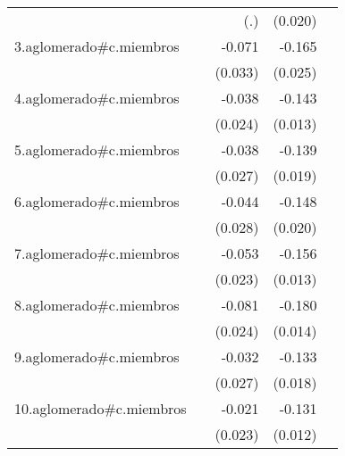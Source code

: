 {\begin{longtable}{l*{4}{D{.}{.}{-1}}}
            &                     &         (.)         &     (0.020)         &                     \\
\addlinespace
3.aglomerado#c.miembros&                     &      -0.071\sym{*}  &      -0.165\sym{***}&                     \\
            &                     &     (0.033)         &     (0.025)         &                     \\
\addlinespace
4.aglomerado#c.miembros&                     &      -0.038         &      -0.143\sym{***}&                     \\
            &                     &     (0.024)         &     (0.013)         &                     \\
\addlinespace
5.aglomerado#c.miembros&                     &      -0.038         &      -0.139\sym{***}&                     \\
            &                     &     (0.027)         &     (0.019)         &                     \\
\addlinespace
6.aglomerado#c.miembros&                     &      -0.044         &      -0.148\sym{***}&                     \\
            &                     &     (0.028)         &     (0.020)         &                     \\
\addlinespace
7.aglomerado#c.miembros&                     &      -0.053\sym{*}  &      -0.156\sym{***}&                     \\
            &                     &     (0.023)         &     (0.013)         &                     \\
\addlinespace
8.aglomerado#c.miembros&                     &      -0.081\sym{***}&      -0.180\sym{***}&                     \\
            &                     &     (0.024)         &     (0.014)         &                     \\
\addlinespace
9.aglomerado#c.miembros&                     &      -0.032         &      -0.133\sym{***}&                     \\
            &                     &     (0.027)         &     (0.018)         &                     \\
\addlinespace
10.aglomerado#c.miembros&                     &      -0.021         &      -0.131\sym{***}&                     \\
            &                     &     (0.023)         &     (0.012)         &                     \\

\end{longtable}}
